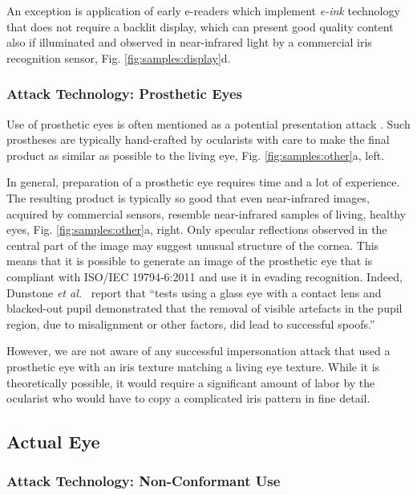 \documentclass[format=acmsmall, review=false, timestamp=false]{acmart}
\newcommand{\etal}{{\it et al.}~}
\begin{document}
An exception is application of early e-readers {which} implement {\it e-ink} technology that does not require a backlit display, which can present good quality content also if illuminated and observed in near-infrared light by a commercial iris recognition sensor, Fig. \ref{fig:samples:display}d.


\subsubsection{Attack Technology: Prosthetic Eyes}

Use of prosthetic eyes is often mentioned as a potential presentation attack \cite{Zuo_TIFS_2007,Toth_EB_2009,Rigas_PRL_2015,Toth_EB_2015,Czajka_TIFS_2015, Galbally_IWBF_2016, Czajka_Handbook_2016}. Such prostheses are typically hand-crafted by ocularists with care to make the final product as similar as possible to the living eye, Fig. \ref{fig:samples:other}a, left.

In general, preparation of a prosthetic eye requires time and a lot of experience. The resulting product is typically so good that even {near-infrared} images, acquired by commercial {sensors}, resemble {near-infrared} samples of living, healthy eyes, Fig. \ref{fig:samples:other}a, right{.} {O}nly specular reflections observed in the central part of the image may suggest unusual structure of the cornea. This means that it is possible to generate an image of the prosthetic eye that is compliant with ISO/IEC 19794-6:2011 and use it in evading recognition. Indeed, Dunstone \etal \cite{Dunstone_BTT_2011} report that ``tests using a glass eye with a contact lens and blacked-out pupil demonstrated that the removal of visible artefacts in the pupil region, due to misalignment or other factors, did lead to successful spoofs.''

However, we are not aware of any successful impersonation attack that used a prosthetic eye with an iris texture matching a living eye texture. While it is theoretically possible, it would require a significant amount of labor by the ocularist who would have to copy a complicated iris pattern in fine detail. 



\subsection{Actual Eye}
\label{sec:KnownVulnerabilities_ActualEye}

\subsubsection{Attack Technology: Non-Conformant Use}
\end{document}
